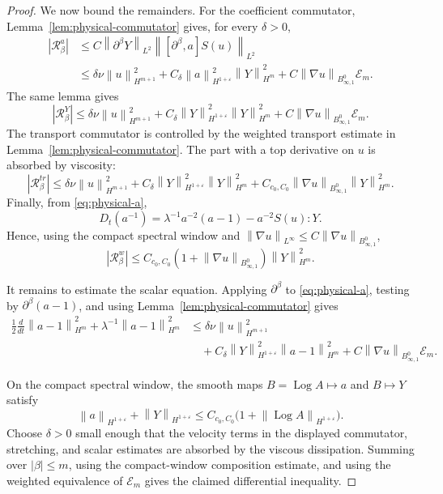 \documentclass[10pt,a4paper]{amsart}
\newcommand{\Besov}{B^0_{\infty,1}}
\newcommand{\Log}{\operatorname{Log}}
\newcommand{\calE}{\mathcal E}
\newcommand{\calR}{\mathcal R}
\newcommand{\eps}{\varepsilon}
\newcommand{\norm}[1]{\left\lVert #1\right\rVert}
\begin{document}
\begin{proof}
We now bound the remainders.  For the coefficient commutator,
Lemma~\ref{lem:physical-commutator} gives, for every \(\delta>0\),
\[
\begin{aligned}
  |\calR_\beta^{a}|
  &\le C\norm{\partial^\beta Y}_{L^2}
       \norm{[\partial^\beta,a]S(u)}_{L^2}  \\
  &\le \delta\nu\norm{u}_{H^{m+1}}^2
      +C_\delta\norm{a}_{H^{1+\eps}}^2\norm{Y}_{H^m}^2
      +C\norm{\nabla u}_{\Besov}\calE_m .
\end{aligned}
\label{eq:a-commutator-remainder}
\]
The same lemma gives
\[
  |\calR_\beta^{Y}|
  \le \delta\nu\norm{u}_{H^{m+1}}^2
      +C_\delta\norm{Y}_{H^{1+\eps}}^2\norm{Y}_{H^m}^2
      +C\norm{\nabla u}_{\Besov}\calE_m .
  \label{eq:Y-stretching-remainder}
\]
The transport commutator is controlled by the weighted transport estimate in
Lemma~\ref{lem:physical-commutator}.  The part with a top derivative on \(u\)
is absorbed by viscosity:
\[
  |\calR_\beta^{tr}|
  \le \delta\nu\norm{u}_{H^{m+1}}^2
      +C_\delta\norm{Y}_{H^{1+\eps}}^2\norm{Y}_{H^m}^2
      +C_{c_0,C_0}\norm{\nabla u}_{\Besov}\norm{Y}_{H^m}^2 .
  \label{eq:Y-transport-remainder}
\]
Finally, from \eqref{eq:physical-a},
\[
  D_t(a^{-1})=\lambda^{-1}a^{-2}(a-1)-a^{-2}S(u):Y .
\]
Hence, using the compact spectral window and
\(\norm{\nabla u}_{L^\infty}\le C\norm{\nabla u}_{\Besov}\),
\[
  |\calR_\beta^w|
  \le C_{c_0,C_0}\left(1+\norm{\nabla u}_{\Besov}\right)
      \norm{Y}_{H^m}^2 .
  \label{eq:weight-remainder}
\]

It remains to estimate the scalar equation.  Applying \(\partial^\beta\) to
\eqref{eq:physical-a}, testing by \(\partial^\beta(a-1)\), and using
Lemma~\ref{lem:physical-commutator} gives
\[
\begin{aligned}
  \frac12\frac{d}{dt}\norm{a-1}_{H^m}^2
  +\lambda^{-1}\norm{a-1}_{H^m}^2
  &\le \delta\nu\norm{u}_{H^{m+1}}^2  \\
  &\quad+C_\delta\norm{Y}_{H^{1+\eps}}^2\norm{a-1}_{H^m}^2
  +C\norm{\nabla u}_{\Besov}\calE_m .
\end{aligned}
\label{eq:a-high-order}
\]

On the compact spectral window, the smooth maps
\(B=\Log A\mapsto a\) and \(B\mapsto Y\) satisfy
\[
  \norm{a}_{H^{1+\eps}}+\norm{Y}_{H^{1+\eps}}
  \le C_{c_0,C_0}\bigl(1+\norm{\Log A}_{H^{1+\eps}}\bigr).
  \label{eq:window-log-composition}
\]
Choose \(\delta>0\) small enough that the velocity terms in the displayed commutator, stretching, and scalar estimates are absorbed by the viscous dissipation.  Summing over \(|\beta|\le m\), using the compact-window composition estimate, and using the weighted equivalence of \(\calE_m\) gives the claimed differential inequality.
\end{proof}
\end{document}
